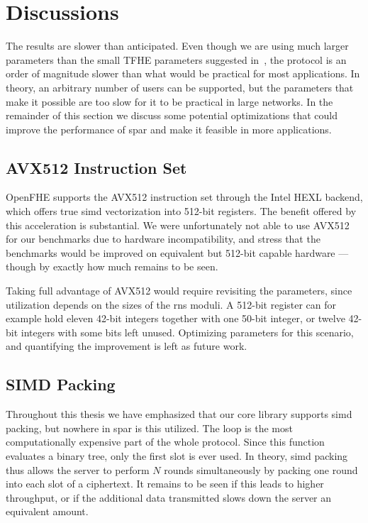 \section{Discussions}
\label{sec:results:discussion}
The results are slower than anticipated. Even though we are using much larger parameters than the small TFHE parameters suggested in~\cite{cryptoeprint:2025/860}, the protocol is an order of magnitude slower than what would be practical for most applications. In theory, an arbitrary number of users can be supported, but the parameters that make it possible are too slow for it to be practical in large networks. In the remainder of this section we discuss some potential optimizations that could improve the performance of \gls{spar} and make it feasible in more applications. %

\subsection{AVX512 Instruction Set}
\label{sec:avx512}
OpenFHE supports the AVX512 instruction set through the Intel HEXL backend, which offers true \gls{simd} vectorization into 512-bit registers. The benefit offered by this acceleration is substantial. We were unfortunately not able to use AVX512 for our benchmarks due to hardware incompatibility, and stress that the benchmarks would be improved on equivalent but 512-bit capable hardware --- though by exactly how much remains to be seen.

Taking full advantage of AVX512 would require revisiting the parameters, since utilization depends on the sizes of the \gls{rns} moduli. A 512-bit register can for example hold eleven 42-bit integers together with one 50-bit integer, or twelve 42-bit integers with some bits left unused. Optimizing parameters for this scenario, and quantifying the improvement is left as future work.

\subsection{SIMD Packing}
\label{sec:simd-packing}
Throughout this thesis we have emphasized that our core library supports \gls{simd} packing, but nowhere in \gls{spar} is this utilized. The \serverWrite{} loop is the most computationally expensive part of the whole protocol. Since this function evaluates a binary tree, only the first slot is ever used. In theory, \gls{simd} packing thus allows the server to perform $N$ rounds simultaneously by packing one round into each slot of a ciphertext. It remains to be seen if this leads to higher throughput, or if the additional data transmitted slows down the server an equivalent amount.

